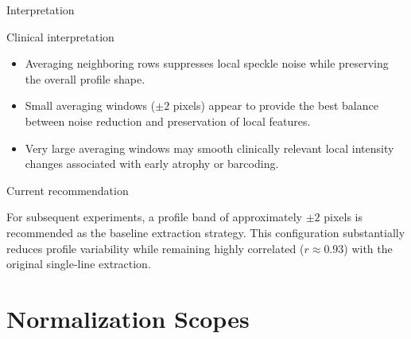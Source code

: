 \documentclass[aspectratio=169]{beamer}
\begin{document}
\begin{frame}{Interpretation}

\begin{block}{Clinical interpretation}

\begin{itemize}
\item Averaging neighboring rows suppresses local speckle noise while preserving the overall profile shape.
\item Small averaging windows ($\pm2$ pixels) appear to provide the best balance between noise reduction and preservation of local features.
\item Very large averaging windows may smooth clinically relevant local intensity changes associated with early atrophy or barcoding.
\end{itemize}

\end{block}

\vspace{0.4cm}

\begin{alertblock}{Current recommendation}

For subsequent experiments, a profile band of approximately
$\pm2$ pixels is recommended as the baseline extraction strategy.
This configuration substantially reduces profile variability while
remaining highly correlated ($r\approx0.93$) with the original
single-line extraction.

\end{alertblock}

\end{frame}

\section{Normalization Scopes}
\end{document}
